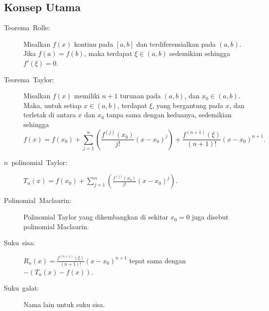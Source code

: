\subsection{Konsep Utama}
\begin{description}
\item [{Teorema~Rolle:}] Misalkan $f(x)$ kontinu
pada $[a,b]$ dan terdiferensialkan pada $(a,b)$. Jika $f(a)=f(b)$,
maka terdapat $\xi\in(a,b)$ sedemikian sehingga $f'(\xi)=0$.
\item [{Teorema~Taylor:}]  Misalkan $f(x)$ memiliki
$n+1$ turunan pada $(a,b)$, dan $x_{0}\in(a,b)$. Maka, untuk setiap
$x\in(a,b)$, terdapat $\xi$, yang bergantung pada $x$, dan terletak
di antara $x$ dan $x_{0}$ tanpa sama dengan keduanya, sedemikian
sehingga
\[
f(x)=f(x_{0})+\sum_{j=1}^{n}\left(\frac{f^{(j)}(x_{0})}{j!}(x-x_{0})^{j}\right)+\frac{f^{(n+1)}(\xi)}{(n+1)!}(x-x_{0})^{n+1}.
\]
\item [{$n$~polinomial~Taylor:}] 
$T_{n}(x)=f(x_{0})+\sum_{j=1}^{n}\left(\frac{f^{(j)}(x_{0})}{j!}(x-x_{0})^{j}\right)$.
\item [{Polinomial~Maclaurin:}] Polinomial
Taylor yang dikembangkan di sekitar $x_{0}=0$ juga disebut polinomial
Maclaurin.
\item [{Suku~sisa:}] $R_{n}(x)=\frac{f^{(n+1)}(\xi)}{(n+1)!}(x-x_{0})^{n+1}$
tepat sama dengan $-\left(T_{n}(x)-f(x)\right)$.
\item [{Suku~galat:}] Nama lain untuk suku sisa.
\end{description}
